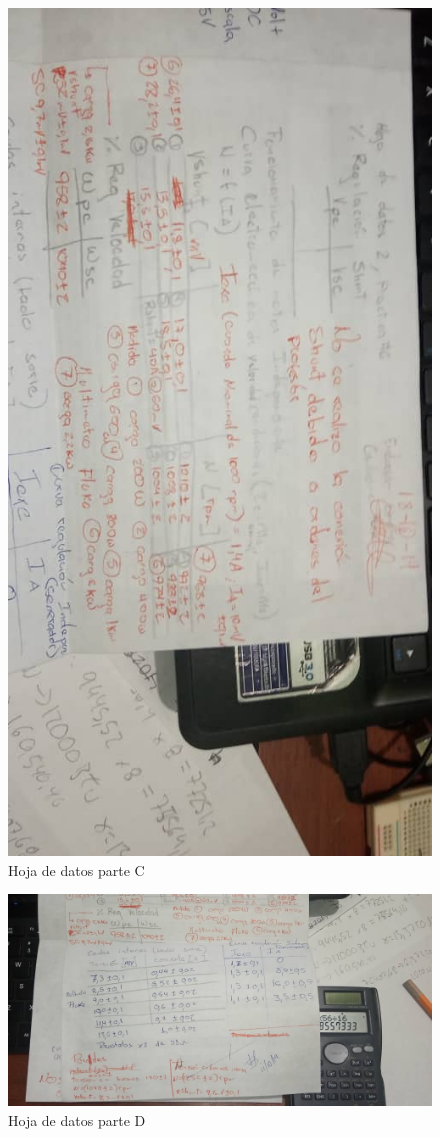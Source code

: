 \documentclass[11pt,letterpaper]{article}     %
\begin{document}
\begin{figure}[H]
	\centering
	\includegraphics[scale=0.6]{./recursos-Lab6/HojaDeDatosC.jpeg}
	\caption{Hoja de datos parte C}
	\label{fig:Hoja3}
\end{figure}
\begin{figure}[H]
	\centering
	\includegraphics[scale=0.8]{./recursos-Lab6/HojaDeDatosD.jpeg}
	\caption{Hoja de datos parte D}
	\label{fig:Hoja4}
\end{figure}
\end{document}
